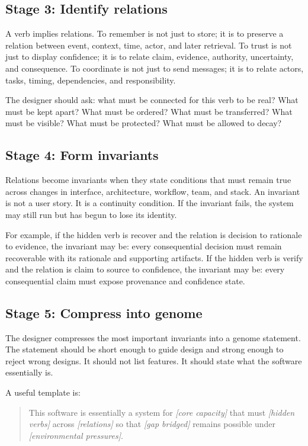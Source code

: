 \documentclass[11pt]{article}
\begin{document}
\subsection{Stage 3: Identify relations}

A verb implies relations. To remember is not just to store; it is to preserve a relation between event, context, time, actor, and later retrieval. To trust is not just to display confidence; it is to relate claim, evidence, authority, uncertainty, and consequence. To coordinate is not just to send messages; it is to relate actors, tasks, timing, dependencies, and responsibility.

The designer should ask: what must be connected for this verb to be real? What must be kept apart? What must be ordered? What must be transferred? What must be visible? What must be protected? What must be allowed to decay?

\subsection{Stage 4: Form invariants}

Relations become invariants when they state conditions that must remain true across changes in interface, architecture, workflow, team, and stack. An invariant is not a user story. It is a continuity condition. If the invariant fails, the system may still run but has begun to lose its identity.

For example, if the hidden verb is recover and the relation is decision to rationale to evidence, the invariant may be: every consequential decision must remain recoverable with its rationale and supporting artifacts. If the hidden verb is verify and the relation is claim to source to confidence, the invariant may be: every consequential claim must expose provenance and confidence state.

\subsection{Stage 5: Compress into genome}

The designer compresses the most important invariants into a genome statement. The statement should be short enough to guide design and strong enough to reject wrong designs. It should not list features. It should state what the software essentially is.

A useful template is:

\begin{quote}
This software is essentially a system for \emph{[core capacity]} that must \emph{[hidden verbs]} across \emph{[relations]} so that \emph{[gap bridged]} remains possible under \emph{[environmental pressures]}.
\end{quote}
\end{document}
